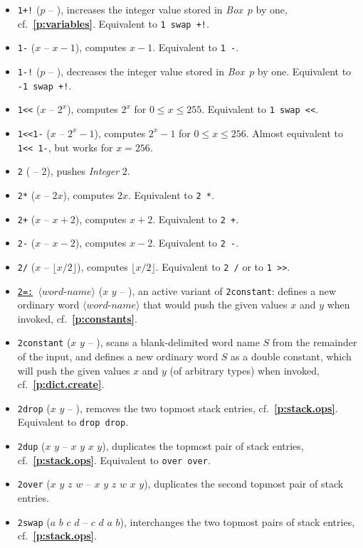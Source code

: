\documentclass[12pt,oneside]{article}
\def\refpoint#1{{\rm\textbf{\ref{#1}}}}
\let\ptref=\refpoint
\begin{document}
\begin{itemize}
\item {\tt 1+!} ($p$ -- ), increases the integer value stored in {\em Box\/}~$p$ by one, cf.~\ptref{p:variables}. Equivalent to {\tt 1 swap +!}.
\item {\tt 1-} ($x$ -- $x-1$), computes $x-1$. Equivalent to {\tt 1 -}.
\item {\tt 1-!} ($p$ -- ), decreases the integer value stored in {\em Box\/}~$p$ by one. Equivalent to {\tt -1 swap +!}.
\item {\tt 1<{}<} ($x$ -- $2^x$), computes $2^x$ for $0\leq x\leq 255$. Equivalent to {\tt 1 swap <{}<}.
\item {\tt 1<{}<1-} ($x$ -- $2^x-1$), computes $2^x-1$ for $0\leq x\leq 256$. Almost equivalent to {\tt 1<{}< 1-}, but works for $x=256$.
\item {\tt 2} ( -- $2$), pushes {\em Integer\/} $2$.
\item {\tt 2*} ($x$ -- $2x$), computes $2x$. Equivalent to {\tt 2 *}.
\item {\tt 2+} ($x$ -- $x+2$), computes $x+2$. Equivalent to {\tt 2 +}.
\item {\tt 2-} ($x$ -- $x-2$), computes $x-2$. Equivalent to {\tt 2 -}.
\item {\tt 2/} ($x$ -- $\lfloor x/2\rfloor$), computes $\lfloor x/2\rfloor$. Equivalent to {\tt 2 /} or to {\tt 1 >{}>}.
\item {\tt \underline{2=:} $\langle\textit{word-name}\rangle$} ($x$ $y$ -- ), an active variant of {\tt 2constant}: defines a new ordinary word $\langle\textit{word-name}\rangle$ that would push the given values $x$ and $y$ when invoked, cf.~\ptref{p:constants}.
\item {\tt 2constant} ($x$ $y$ -- ), scans a blank-delimited word name $S$ from the remainder of the input, and defines a new ordinary word $S$ as a double constant, which will push the given values $x$ and $y$ (of arbitrary types) when invoked, cf.~\ptref{p:dict.create}.
\item {\tt 2drop} ($x$ $y$ -- ), removes the two topmost stack entries, cf.~\ptref{p:stack.ops}. Equivalent to {\tt drop drop}.
\item {\tt 2dup} ($x$ $y$ -- $x$ $y$ $x$ $y$), duplicates the topmost pair of stack entries, cf.~\ptref{p:stack.ops}. Equivalent to {\tt over over}.
\item {\tt 2over} ($x$ $y$ $z$ $w$ -- $x$ $y$ $z$ $w$ $x$ $y$), duplicates the second topmost pair of stack entries.
\item {\tt 2swap} ($a$ $b$ $c$ $d$ -- $c$ $d$ $a$ $b$), interchanges the two topmost pairs of stack entries, cf.~\ptref{p:stack.ops}.

\end{itemize}
\end{document}
